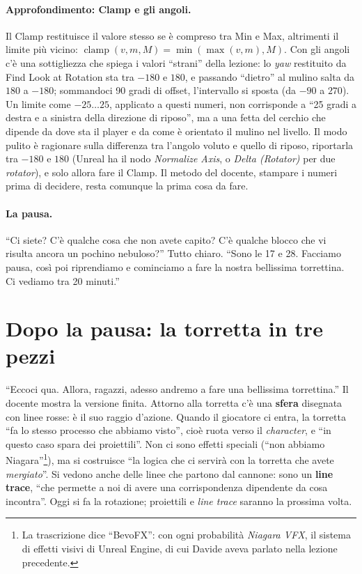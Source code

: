 \paragraph{Approfondimento: Clamp e gli angoli.} Il Clamp restituisce il valore stesso
se è compreso tra Min e Max, altrimenti il limite più vicino:
$\operatorname{clamp}(v, m, M) = \min(\max(v, m), M)$. Con gli angoli c'è una
sottigliezza che spiega i valori ``strani'' della lezione: lo \emph{yaw} restituito da
Find Look at Rotation sta tra $-180$ e $180$, e passando ``dietro'' al mulino salta da
$180$ a $-180$; sommandoci 90 gradi di offset, l'intervallo si sposta (da $-90$ a
$270$). Un limite come $-25 \ldots 25$, applicato a questi numeri, non corrisponde a
``25 gradi a destra e a sinistra della direzione di riposo'', ma a una fetta del cerchio
che dipende da dove sta il player e da come è orientato il mulino nel livello. Il
modo pulito è ragionare sulla differenza tra l'angolo voluto e quello di riposo,
riportarla tra $-180$ e $180$ (Unreal ha il nodo \emph{Normalize Axis}, o \emph{Delta
(Rotator)} per due \emph{rotator}), e solo allora fare il Clamp. Il metodo del docente,
stampare i numeri prima di decidere, resta comunque la prima cosa da fare.

\paragraph{La pausa.} ``Ci siete? C'è qualche cosa che non avete capito? C'è qualche
blocco che vi risulta ancora un pochino nebuloso?'' Tutto chiaro. ``Sono le 17 e 28.
Facciamo pausa, così poi riprendiamo e cominciamo a fare la nostra bellissima
torrettina. Ci vediamo tra 20 minuti.''

\section{Dopo la pausa: la torretta in tre pezzi}
\label{ue4:sec:torretta}

``Eccoci qua. Allora, ragazzi, adesso andremo a fare una bellissima torrettina.'' Il
docente mostra la versione finita. Attorno alla torretta c'è una \textbf{sfera} disegnata
con linee rosse: è il suo raggio d'azione. Quando il giocatore ci entra, la torretta
``fa lo stesso processo che abbiamo visto'', cioè ruota verso il \emph{character}, e
``in questo caso spara dei proiettili''. Non ci sono effetti speciali (``non abbiamo
Niagara''\footnote{La trascrizione dice ``BevoFX'': con ogni probabilità
\emph{Niagara VFX}, il sistema di effetti visivi di Unreal Engine, di cui Davide aveva
parlato nella lezione precedente.}), ma si costruisce ``la logica che ci servirà con la
torretta che avete \emph{mergiato}''. Si vedono anche delle linee che partono dal
cannone: sono un \textbf{line trace}, ``che permette a noi di avere una corrispondenza
dipendente da cosa incontra''. Oggi si fa la rotazione; proiettili e \emph{line trace}
saranno la prossima volta.

